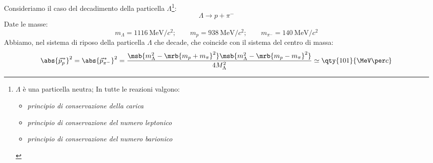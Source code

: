 \begin{example}[]
	Consideriamo il caso del decadimento della particella $\Lambda$\footnote{
		$\Lambda$ è una particella neutra; In tutte le reazioni valgono:
		\begin{itemize}
			\item \textit{principio di conservazione della carica}
			\item \textit{principio di conservazione del numero leptonico}
			\item \textit{principio di conservazione del numero barionico}
		\end{itemize}
	}:
	\begin{equation}
		\Lambda \rightarrow p + \pi ^{-}
	\end{equation}
	Date le masse:
	\begin{equation}
		m _{\Lambda} = \qty{1116}{\MeV \per c^2};
		\qquad
		m_p = \qty{938}{\MeV \per c^2};
		\qquad
		m _{\pi^-} = \qty{140}{\MeV \per c^2}
	\end{equation}
	Abbiamo, nel sistema di riposo della particella $\Lambda$ che decade, che
	coincide con il sistema del centro di massa:
	\begin{equation}
		\abs{\vec{p}_{p}^{\,\ast}}^{2}
		= \abs{\vec{p}_{\pi^-}^{\,\ast}}^{2}
		= \frac{
			\msb{m _{\Lambda} ^{2} - \mrb{m _{p} + m _{\pi}}^{2}}
			\msb{m _{\Lambda} ^{2} - \mrb{m _{p} - m _{\pi}}^{2}}
		}{4 M _{\Lambda}^{2}}
		\simeq \qty{101}{\MeV \per c}
	\end{equation}
\end{example}

